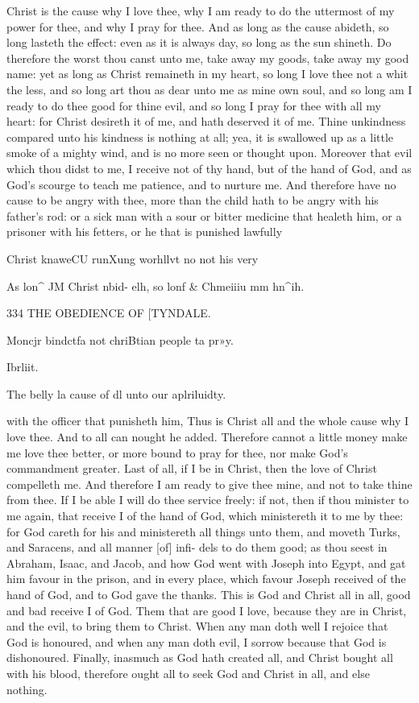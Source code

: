 \documentclass{custom}
\begin{document}
{Christ is the cause why I love thee, why I am ready to 
do the uttermost of my power for thee, and why I pray for 
thee. And as long as the cause abideth, so long lasteth 
the effect: even as it is always day, so long as the sun 
shineth. Do therefore the worst thou canst unto me, take 
away my goods, take away my good name: yet as long 
as Christ remaineth in my heart, so long I love thee not a 
whit the less, and so long art thou as dear unto me as 
mine own soul, and so long am I ready to do thee good 
for thine evil, and so long I pray for thee with all my 
heart: for Christ desireth it of me, and hath deserved it 
of me. Thine unkindness compared unto his kindness is 
nothing at all; yea, it is swallowed up as a little smoke of a 
mighty wind, and is no more seen or thought upon. 
Moreover that evil which thou didst to me, I receive not 
of thy hand, but of the hand of God, and as God's 
scourge to teach me patience, and to nurture me. And 
therefore have no cause to be angry with thee, more than 
the child hath to be angry with his father's rod: or a sick 
man with a sour or bitter medicine that healeth him, or a 
prisoner with his fetters, or he that is punished lawfully 

Christ 
knaweCU 
runXung 
worhllvt no 
not his very 

As lon^ JM 
Christ nbid- 
elh, so lonf 
& Chmeiiiu 
mm hn^ih. 


334
THE OBEDIENCE OF
[TYNDALE.

Moncjr 
bindctfa not 
chriBtian 
people ta 
pr»y. 

Ibrliit. 

The belly la 
cause of dl 
unto our 
aplriluidty. 

with the officer that punisheth him, Thus is Christ all 
and the whole cause why I love thee. And to all can 
nought he added. Therefore cannot a little money make 
me love thee better, or more bound to pray for thee, nor 
make God's commandment greater. Last of all, if I be 
in Christ, then the love of Christ compelleth me. And 
therefore I am ready to give thee mine, and not to take 
thine from thee. If I be able I will do thee service freely: 
if not, then if thou minister to me again, that receive I of 
the hand of God, which ministereth it to me by thee: for 
God careth for his and ministereth all things unto them, 
and moveth Turks, and Saracens, and all manner [of] infi- 
dels to do them good; as thou seest in Abraham, Isaac, 
and Jacob, and how God went with Joseph into Egypt, 
and gat him favour in the prison, and in every place, which 
favour Joseph received of the hand of God, and to God 
gave the thanks. This is God and Christ all in all, good 
and bad receive I of God. Them that are good I love, 
because they are in Christ, and the evil, to bring them to 
Christ. When any man doth well I rejoice that God is 
honoured, and when any man doth evil, I sorrow because 
that God is dishonoured. Finally, inasmuch as God 
hath created all, and Christ bought all with his blood, 
therefore ought all to seek God and Christ in all, and else 
nothing. 

}
\end{document}
